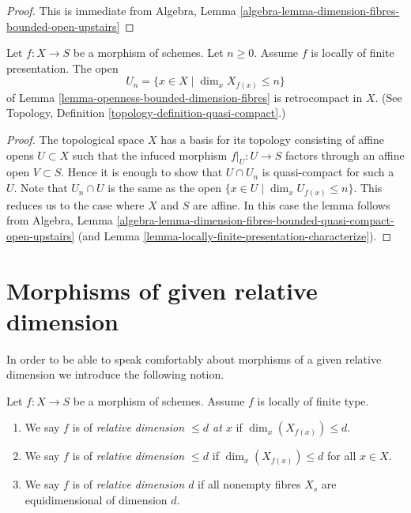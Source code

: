 \begin{proof}
This is immediate from
Algebra,
Lemma \ref{algebra-lemma-dimension-fibres-bounded-open-upstairs}
\end{proof}

\begin{lemma}
\label{lemma-openness-bounded-dimension-fibres-finite-presentation}
Let $f : X \to S$ be a morphism of schemes.
Let $n \geq 0$. Assume $f$ is locally of finite presentation.
The open
$$
U_n = \{x \in X \mid \dim_x X_{f(x)} \leq n\}
$$
of Lemma \ref{lemma-openness-bounded-dimension-fibres} is retrocompact
in $X$. (See Topology, Definition \ref{topology-definition-quasi-compact}.)
\end{lemma}

\begin{proof}
The topological space $X$ has a basis for its topology consisting of
affine opens $U \subset X$ such that the infuced morphism
$f|_U : U \to S$ factors through an affine open $V \subset S$. Hence
it is enough to show that $U \cap U_n$ is quasi-compact for such a $U$.
Note that $U_n \cap U$ is the same as the open
$\{x \in U \mid \dim_x U_{f(x)} \leq n\}$. This reduces us to the case
where $X$ and $S$ are affine. In this case the lemma follows from
Algebra,
Lemma \ref{algebra-lemma-dimension-fibres-bounded-quasi-compact-open-upstairs}
(and Lemma \ref{lemma-locally-finite-presentation-characterize}).
\end{proof}





\section{Morphisms of given relative dimension}
\label{section-relative-dimension}

\noindent
In order to be able to speak comfortably about morphisms of a
given relative dimension we introduce the following notion.

\begin{definition}
\label{definition-relative-dimension-d}
Let $f : X \to S$ be a morphism of schemes.
Assume $f$ is locally of finite type.
\begin{enumerate}
\item We say $f$ is of {\it relative dimension $\leq d$ at $x$} if
$\dim_x(X_{f(x)}) \leq d$.
\item We say $f$ is of {\it relative dimension $\leq d$} if
$\dim_x(X_{f(x)}) \leq d$ for all $x \in X$.
\item We say $f$ is of {\it relative dimension $d$} if
all nonempty fibres $X_s$ are equidimensional of dimension $d$.
\end{enumerate}
\end{definition}

